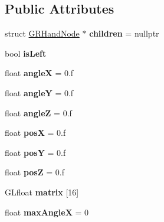 \subsection*{Public Attributes}
\begin{DoxyCompactItemize}
\item 
\mbox{\label{structGRHandNode_abd81341a6dad0397938ee7f69accfe8e}} 
struct \mbox{\hyperlink{structGRHandNode}{G\+R\+Hand\+Node}} $\ast$ {\bfseries children} = nullptr
\item 
\mbox{\label{structGRHandNode_a9b10a17da4f3b72ef6d917880889d47c}} 
bool {\bfseries is\+Left}
\item 
\mbox{\label{structGRHandNode_a8355043e0a7839f68677339ef73b13fa}} 
float {\bfseries angleX} = 0.f
\item 
\mbox{\label{structGRHandNode_a231f105c988b763bf4179d26ea30ba10}} 
float {\bfseries angleY} = 0.f
\item 
\mbox{\label{structGRHandNode_a1ce523eb937f5c8e1d6a7c3898d4574f}} 
float {\bfseries angleZ} = 0.f
\item 
\mbox{\label{structGRHandNode_afaabcfa51d2a3909bd71bad2e6385998}} 
float {\bfseries posX} = 0.f
\item 
\mbox{\label{structGRHandNode_ae979150bc1a18e651dfdd95838edbd36}} 
float {\bfseries posY} = 0.f
\item 
\mbox{\label{structGRHandNode_a9e6bfc71efde71803e5ddf9feead3c1f}} 
float {\bfseries posZ} = 0.f
\item 
\mbox{\label{structGRHandNode_a873c55b42700ddf29865e906d8aec20c}} 
G\+Lfloat {\bfseries matrix} \mbox{[}16\mbox{]}
\item 
\mbox{\label{structGRHandNode_a467fddd961773ad74e8d71282bcc9ee1}} 
float {\bfseries max\+AngleX} = 0
\item 
\mbox{\label{structGRHandNode_a22f5490d8b82bd71badad0858e7319ca}} 

\end{DoxyCompactItemize}
